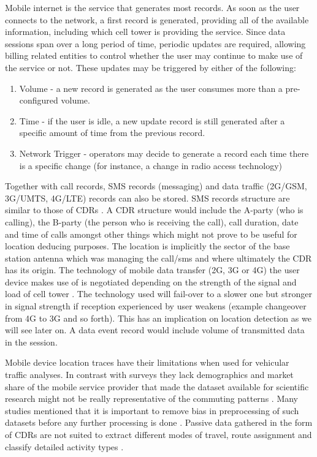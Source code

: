 \documentclass[12pt, a4paper]{report}
\theoremstyle{definition}
\theoremstyle{definition}%
\theoremstyle{definition}%
\theoremstyle{definition}%
\theoremstyle{definition}%
\theoremstyle{definition}%
\begin{document}
Mobile internet is the service that generates most records. As soon as the user connects to the network, a first record is generated, providing all of the available information, including which cell tower is providing the service. Since data sessions span over a long period of time, periodic updates are required, allowing billing related entities to control whether the user may continue to make use of the service or not. These updates may be triggered by either of the following:
\begin{enumerate}
\item Volume - a new record is generated as the user consumes more than a pre-configured volume.
\item Time - if the user is idle, a new update record is still generated after a specific amount of time from the previous record.
\item Network Trigger - operators may decide to generate a record each time there is a specific change (for instance, a change in radio access technology)
\end{enumerate}
	
Together with call records, SMS records (messaging) and data traffic (2G/GSM, 3G/UMTS, 4G/LTE) records can also be stored. SMS records structure are similar to those of CDRs \cite{Calabrese2013}. A CDR structure would include the A-party (who is calling), the B-party (the person who is receiving the call), call duration, date and time of calls amongst other things which might not prove to be useful for location deducing purposes. The location is implicitly the sector of the base station antenna which was managing the call/sms and where ultimately the CDR has its origin. The technology of mobile data transfer (2G, 3G or 4G) the user device makes use of is negotiated depending on the strength of the signal and load of cell tower \cite{Liu2014}. The technology used will fail-over to a slower one but stronger in signal strength if reception experienced by user weakens (example changeover from 4G to 3G and so forth). This has an implication on location detection as we will see later on. A data event record would include volume of transmitted data in the session.

Mobile device location traces have their limitations when used for vehicular traffic analyses. In contrast with surveys they lack demographics \cite{Calabrese2013,Colak2015} and market share of the mobile service provider that made the dataset available for scientific research might not be really representative of the commuting patterns \cite{Calabrese2011}. Many studies mentioned that it is important to remove bias in preprocessing of such datasets before any further processing is done \cite{Iqbal2014,Toole2015}.  Passive data gathered in the form of CDRs are not suited to extract different modes of travel, route assignment and classify detailed activity types \cite{Colak2015}.
\end{document}
